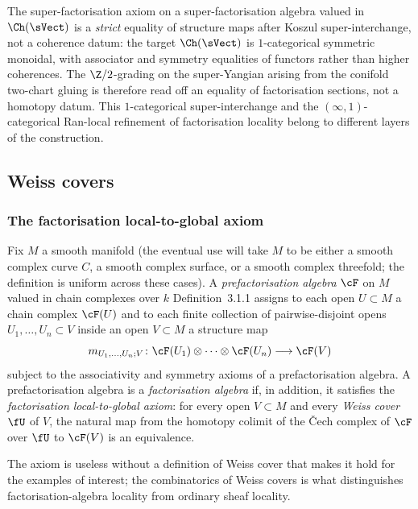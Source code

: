 The super-factorisation axiom on a super-factorisation algebra valued
in $\Ch(\sVect)$ is a \emph{strict} equality of structure maps after
Koszul super-interchange, not a coherence datum: the target
$\Ch(\sVect)$ is $1$-categorical symmetric monoidal, with associator and
symmetry equalities of functors rather than higher coherences. The
$\Z/2$-grading on the super-Yangian arising from the conifold two-chart
gluing is therefore read off an equality of factorisation sections, not
a homotopy datum. This $1$-categorical super-interchange and the
$(\infty, 1)$-categorical Ran-local refinement of factorisation locality
belong to different layers of the construction.

\subsection{Weiss covers}
\label{sec:fa-weiss-covers}

\subsubsection{The factorisation local-to-global axiom}

Fix $M$ a smooth manifold (the eventual use will take $M$ to be either
a smooth complex curve $C$, a smooth complex surface, or a smooth
complex threefold; the definition is uniform across these cases).
A \emph{prefactorisation algebra} $\cF$ on $M$ valued in chain
complexes over $k$ \cite{CostelloGwilliam} Definition~3.1.1 assigns to
each open $U \subset M$ a chain complex $\cF(U)$ and to each finite
collection of pairwise-disjoint opens $U_1, \dots, U_n \subset V$
inside an open $V \subset M$ a structure map
\begin{equation}
\label{eq:prefactorisation-structure-map}
 m_{U_1, \dots, U_n; V} \colon
 \cF(U_1) \otimes \cdots \otimes \cF(U_n) \longrightarrow \cF(V)
\end{equation}
subject to the associativity and symmetry axioms of a prefactorisation
algebra. A prefactorisation algebra is a \emph{factorisation algebra}
if, in addition, it satisfies the \emph{factorisation local-to-global
axiom}: for every open $V \subset M$ and every \emph{Weiss cover}
$\fU$ of $V$, the natural map from the homotopy colimit of the
Čech complex of $\cF$ over $\fU$ to $\cF(V)$ is an equivalence.

The axiom is useless without a definition of Weiss cover that makes it
hold for the examples of interest; the combinatorics of Weiss covers
is what distinguishes factorisation-algebra locality from ordinary
sheaf locality.

